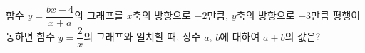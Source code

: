 함수 $y=\dfrac{bx-4}{x+a}$의 그래프를 $x$축의 방향으로 $-2$만큼, $y$축의 방향으로 $-3$만큼 평행이동하면 함수 $y=\dfrac{2}{x}$의 그래프와 일치할 때, 상수 $a$, $b$에 대하여 $a+b$의 값은?
